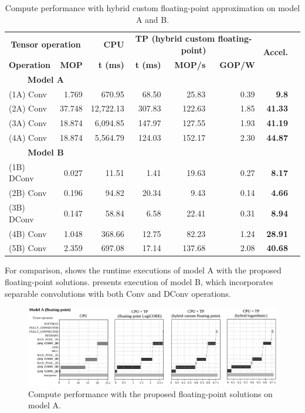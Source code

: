 \begin{table}[!htp]\centering
	\caption{Compute performance with hybrid custom floating-point approximation on model A and B.}\label{tab:performace_float_hybrid}
	\scriptsize
\begin{tabular}{lrrrrrrr}\toprule
	\multicolumn{2}{c}{\textbf{Tensor operation}} &\textbf{CPU} &\multicolumn{3}{c}{\textbf{TP (hybrid custom floating-point)}} &\multirow{2}{*}{\textbf{Accel.}} \\\cmidrule{1-6}
	\textbf{Operation} &\textbf{MOP} &\textbf{t (ms)} &\textbf{t (ms)} &\textbf{MOP/s} &\textbf{GOP/W} & \\\midrule
	\multicolumn{2}{c}{\textbf{Model A}} & & & & & \\
	(1A) Conv &1.769 &670.95 &68.50 &25.83 &0.39 &\textbf{9.8} \\
	(2A) Conv &37.748 &12,722.13 &307.83 &122.63 &1.85 &\textbf{41.33} \\
	(3A) Conv &18.874 &6,094.85 &147.97 &127.55 &1.93 &\textbf{41.19} \\
	(4A) Conv &18.874 &5,564.79 &124.03 &152.17 &2.30 &\textbf{44.87} & \\\midrule
	\multicolumn{2}{c}{\textbf{Model B}} & & & & & \\
	(1B) DConv &0.027 &11.51 &1.41 &19.63 &0.27 &\textbf{8.17} \\
	(2B) Conv &0.196 &94.82 &20.34 &9.43 &0.14 &\textbf{4.66} \\
	(3B) DConv &0.147 &58.84 &6.58 &22.41 &0.31 &\textbf{8.94} \\
	(4B) Conv &1.048 &368.66 &12.75 &82.23 &1.24 &\textbf{28.91} \\
	(5B) Conv &2.359 &697.08 &17.14 &137.68 &2.08 &\textbf{40.68} \\
	\bottomrule
\end{tabular}
\end{table}

For comparison,  shows the runtime executions of model A with the proposed floating-point solutions.  presents execution of model B, which incorporates separable convolutions with both Conv and DConv operations.

\begin{figure}[t!]
	\centering
	\includegraphics[width=\textwidth]{../figures/sched_A_float_all.pdf}
	\caption{Compute performance with the proposed floating-point solutions on model A.}
	\label{fig:sched_model_a_float}
\end{figure}


